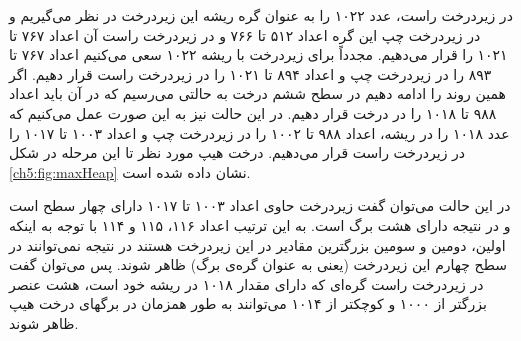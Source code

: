 در زیردرخت راست، عدد ۱۰۲۲ را به عنوان گره ریشه این زیردرخت در نظر می‌گیریم  و در زیردرخت چپ این گره اعداد ۵۱۲ تا ۷۶۶ و در زیردرخت راست آن اعداد ۷۶۷ تا ۱۰۲۱ را قرار می‌دهیم. مجدداً برای زیردرخت با ریشه ۱۰۲۲ سعی می‌کنیم اعداد ۷۶۷ تا ۸۹۳ را در زیردرخت چپ و اعداد ۸۹۴ تا ۱۰۲۱ را در زیردرخت راست قرار دهیم.  اگر همین روند را ادامه دهیم در سطح ششم درخت به حالتی می‌رسیم که در آن باید اعداد ۹۸۸ تا ۱۰۱۸ را در درخت قرار دهیم. در این حالت نیز به این صورت عمل می‌کنیم که عدد ۱۰۱۸ را در ریشه، اعداد ۹۸۸ تا ۱۰۰۲ را در زیردرخت چپ و اعداد ۱۰۰۳ تا ۱۰۱۷ را در زیردرخت راست قرار می‌دهیم. درخت هیپ مورد نظر تا این مرحله در شکل {\ref{ch5:fig:maxHeap}} نشان داده شده است.

در این حالت می‌توان گفت زیردرخت حاوی اعداد ۱۰۰۳ تا ۱۰۱۷ دارای چهار سطح است و در نتیجه دارای هشت برگ است. به این ترتیب اعداد ۱۱۶، ۱۱۵ و ۱۱۴ با توجه به اینکه اولین، دومین و سومین بزرگترین مقادیر در این زیردرخت هستند در نتیجه نمی‌توانند در سطح چهارم این زیردرخت (یعنی به عنوان گره‌ی برگ) ظاهر شوند. پس می‌توان گفت در زیردرخت راست گره‌ای که دارای مقدار ۱۰۱۸ در ریشه خود است، هشت عنصر بزرگتر از ۱۰۰۰ و کوچکتر از ۱۰۱۴ می‌توانند به طور همزمان در برگهای درخت هیپ ظاهر شوند. 

